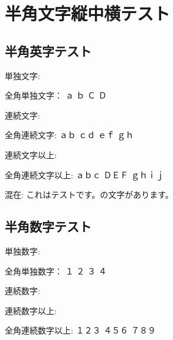 \hypertarget{ux534aux89d2ux6587ux5b57ux7e26ux4e2dux6a2aux30c6ux30b9ux30c8}{%
\section{半角文字縦中横テスト}\label{ux534aux89d2ux6587ux5b57ux7e26ux4e2dux6a2aux30c6ux30b9ux30c8}}

\hypertarget{ux534aux89d2ux82f1ux5b57ux30c6ux30b9ux30c8}{%
\subsection{半角英字テスト}\label{ux534aux89d2ux82f1ux5b57ux30c6ux30b9ux30c8}}

単独文字:   

全角単独文字： ａ ｂ Ｃ Ｄ

連続文字: {\small{}}
{\small{}} {\small{}}
{\small{}}

全角連続文字: ａｂ ｃｄ ｅｆ ｇｈ

連続文字以上:

全角連続文字以上: ａｂｃ ＤＥＦ ｇｈｉｊ

混在:
これはテストです。{\small{}}の文字{\small{}}があります。

\hypertarget{ux534aux89d2ux6570ux5b57ux30c6ux30b9ux30c8}{%
\subsection{半角数字テスト}\label{ux534aux89d2ux6570ux5b57ux30c6ux30b9ux30c8}}

単独数字:   

全角単独数字： １ ２ ３ ４

連続数字: {\small{}}
{\small{}} {\small{}}
{\small{}}

連続数字以上:

全角連続数字以上: １２３ ４５６ ７８９

